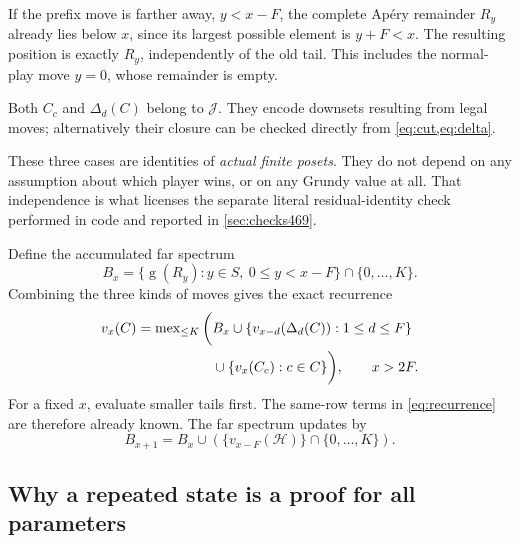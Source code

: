 \documentclass[11pt,letterpaper]{article}
\numberwithin{equation}{section}
\theoremstyle{definition}
\theoremstyle{remark}
\newcommand{\sg}{\operatorname{g}}
\newcommand{\mex}{\operatorname{mex}}
\newcommand{\J}{\mathcal J}
\newcommand{\HH}{\mathcal H}
\begin{document}
If the prefix move is farther away, $y<x-F$, the complete Ap\'ery
remainder $R_y$ already lies below $x$, since its largest possible
element is $y+F<x$. The resulting position is exactly $R_y$,
independently of the old tail. This includes the normal-play move
$y=0$, whose remainder is empty.

Both $C_c$ and $\Delta_d(C)$ belong to $\J$. They encode downsets
resulting from legal moves; alternatively their closure can be
checked directly from \cref{eq:cut,eq:delta}.

These three cases are identities of \emph{actual finite posets}. They do
not depend on any assumption about which player wins, or on any Grundy
value at all. That independence is what licenses the separate literal
residual-identity check performed in code and reported in
\cref{sec:checks469}.

Define the accumulated far spectrum
\begin{equation}\label{eq:far}
 B_x=\{\sg(R_y):y\in S,\ 0\leq y<x-F\}\cap\{0,\ldots,K\}.
\end{equation}
Combining the three kinds of moves gives the exact recurrence
\begin{align}
 v_x(C)=\mex_{\leq K}\bigg(& B_x
       \cup\{v_{x-d}(\Delta_d(C)):1\leq d\leq F\}\notag\\
       &\cup\{v_x(C_c):c\in C\}\bigg),\qquad x>2F.
\label{eq:recurrence}
\end{align}
For a fixed $x$, evaluate smaller tails first. The same-row terms
in \cref{eq:recurrence} are therefore already known. The far spectrum
updates by
\begin{equation}\label{eq:far-update}
 B_{x+1}=B_x\cup
 \left(\{v_{x-F}(\HH)\}\cap\{0,\ldots,K\}\right).
\end{equation}

\subsection{Why a repeated state is a proof for all parameters}
\end{document}
